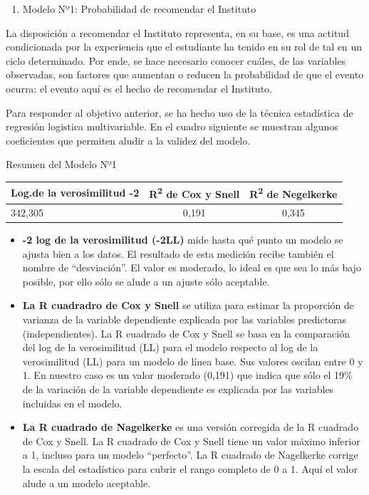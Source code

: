\documentclass[]{book}
\providecommand{\tightlist}{%
  \setlength{\itemsep}{0pt}\setlength{\parskip}{0pt}}
\begin{document}
\begin{enumerate}
\def\labelenumi{\alph{enumi})}
\tightlist
\item
  Modelo Nº1: Probabilidad de recomendar el Instituto
\end{enumerate}

La disposición a recomendar el Instituto representa, en su base, es una
actitud condicionada por la experiencia que el estudiante ha tenido en
su rol de tal en un ciclo determinado. Por ende, se hace necesario
conocer cuáles, de las variables observadas, son factores que aumentan o
reducen la probabilidad de que el evento ocurra: el evento aquí es el
hecho de recomendar el Instituto.

Para responder al objetivo anterior, se ha hecho uso de la técnica
estadística de regresión logistica multivariable. En el cuadro siguiente
se muestran algunos coeficientes que permiten aludir a la validez del
modelo.

Resumen del Modelo Nº1

\begin{longtable}[]{@{}lcc@{}}
\toprule
Log.de la verosimilitud -2 & R\textsuperscript{2} de Cox y Snell &
R\textsuperscript{2} de Negelkerke\tabularnewline
\midrule
\endhead
342,305 & 0,191 & 0,345\tabularnewline
\bottomrule
\end{longtable}

\begin{itemize}
\item
  \textbf{-2 log de la verosimilitud (-2LL)} mide hasta qué punto un
  modelo se ajusta bien a los datos. El resultado de esta medición
  recibe también el nombre de ``desviación''. El valor es moderado, lo
  ideal es que sea lo más bajo posible, por ello sólo se alude a un
  ajuste sólo aceptable.
\item
  \textbf{La R cuadradro de Cox y Snell} se utiliza para estimar la
  proporción de varianza de la variable dependiente explicada por las
  variables predictoras (independientes). La R cuadrado de Cox y Snell
  se basa en la comparación del log de la verosimilitud (LL) para el
  modelo respecto al log de la verosimilitud (LL) para un modelo de
  línea base. Sus valores oscilan entre 0 y 1. En nuestro caso es un
  valor moderado (0,191) que indica que sólo el 19\% de la variación de
  la variable dependiente es explicada por las variables incluidas en el
  modelo.
\item
  \textbf{La R cuadrado de Nagelkerke} es una versión corregida de la R
  cuadrado de Cox y Snell. La R cuadrado de Cox y Snell tiene un valor
  máximo inferior a 1, incluso para un modelo ``perfecto''. La R
  cuadrado de Nagelkerke corrige la escala del estadístico para cubrir
  el rango completo de 0 a 1. Aquí el valor alude a un modelo aceptable.
\end{itemize}
\end{document}
